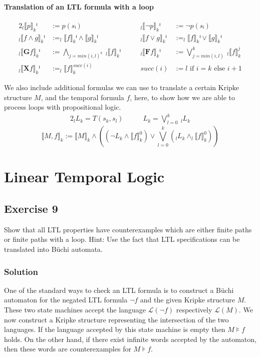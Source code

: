 \documentclass[a4paper, 12pt]{article}
\begin{document}
\paragraph{Translation of an LTL formula with a loop}
\begin{alignat*}{2}
    _l⟦p⟧_kⁱ            &:= p(sᵢ)\quad\quad&
    _l⟦¬p⟧_kⁱ           &:= ¬ p(sᵢ)\\
    _l⟦f ∧ g⟧_kⁱ        &:= _l⟦f⟧_kⁱ ∧ ⟦g⟧_kⁱ\quad\quad&
    _l⟦f ∨ g⟧_kⁱ        &:= _l⟦f⟧_kⁱ ∨ ⟦g⟧_kⁱ\\
    _l⟦\mathbf{G} f⟧_kⁱ &:= ⋀_{j=min(i,l)^k} ~ _l⟦f⟧_kⁱ\quad\quad&
    _l⟦\mathbf{F} f⟧_kⁱ &:= ⋁_{j=min(i,l)}^k ~ _l⟦f⟧_k^{j}\\
    _l⟦\mathbf{X} f⟧_kⁱ &:= _l⟦f⟧_k^{succ(i)}\quad\quad&
    succ(i)             &:= l \text{ if } i = k \text{ else } i+1
\end{alignat*}

We also include additional formulas we can use to translate a certain Kripke
structure $M$, and the temporal formula $f$, here, to show how we are able to
process loops with propositional logic.
\begin{alignat*}{2}
    _l L _k = T(s_k, s_l)\quad\quad&
    L_k = ⋁_{l=0}^k ~ _l L _k
\end{alignat*}
\[
    ⟦M, f⟧_k := ⟦M⟧_k ∧
    \left(
          \left( ¬ L_k ∧ ⟦f⟧_k^0 \right) ∨
          ⋁_{l=0}^k \left( _l L _k ∧ _l ⟦ f ⟧_k^0 \right)
    \right)
\]

\section{Linear Temporal Logic}

\subsection{Exercise 9}

Show that all LTL properties have counterexamples which are either finite
paths or finite paths with a loop. Hint: Use the fact that LTL specifications
can be translated into Büchi automata.

\subsubsection{Solution}

One of the standard ways to check an LTL formula is to construct a Büchi
automaton for the negated LTL formula $¬f$ and the given Kripke structure $M$.
These two state machines accept the language $ℒ(¬f)$ respectively $ℒ(M)$. We
now construct a Kripke structure representing the intersection of the two
languages. If the language accepted by this state machine is empty then $M⊧f$
holds. On the other hand, if there exist infinite words accepted by the
automaton, then these words are counterexamples for $M⊧f$.\\
\end{document}
